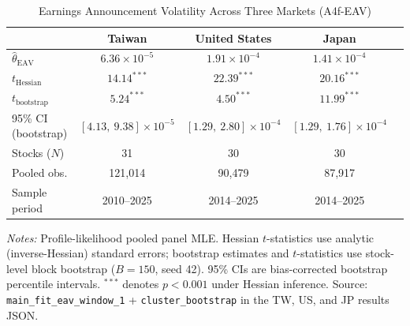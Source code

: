 \begin{table}[H]
\centering
\caption{Earnings Announcement Volatility Across Three Markets (A4f-EAV)}
\label{tab:eav_main}
\begin{tabular}{lcccc}
\toprule
& Taiwan & United States & Japan \\
\midrule
$\hat{\theta}_{\text{EAV}}$ & $6.36 \times 10^{-5}$ & $1.91 \times 10^{-4}$ & $1.41 \times 10^{-4}$ \\
$t_{\text{Hessian}}$ & $14.14^{***}$ & $22.39^{***}$ & $20.16^{***}$ \\
$t_{\text{bootstrap}}$ & $5.24^{***}$ & $4.50^{***}$ & $11.99^{***}$ \\
95\% CI (bootstrap) & $[4.13,\ 9.38] \times 10^{-5}$ & $[1.29,\ 2.80] \times 10^{-4}$ & $[1.29,\ 1.76] \times 10^{-4}$ \\
\midrule
Stocks ($N$) & 31 & 30 & 30 \\
Pooled obs. & 121,014 & 90,479 & 87,917 \\
Sample period & 2010--2025 & 2014--2025 & 2014--2025 \\
\bottomrule
\end{tabular}
\begin{flushleft}
\small \textit{Notes:} Profile-likelihood pooled panel MLE. Hessian $t$-statistics use analytic (inverse-Hessian) standard errors; bootstrap estimates and $t$-statistics use stock-level block bootstrap ($B=150$, seed 42). 95\% CIs are bias-corrected bootstrap percentile intervals. $^{***}$ denotes $p < 0.001$ under Hessian inference. Source: \texttt{main\_fit\_eav\_window\_1} + \texttt{cluster\_bootstrap} in the TW, US, and JP results JSON.%
\end{flushleft}
\end{table}

